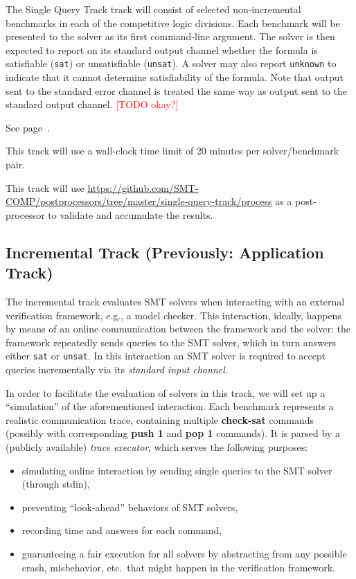\documentclass[12pt]{article}
\newcommand{\akey}[1]{\textbf{#1}\xspace}
\newcommand{\rem}[1]{\textcolor{red}{[#1]}}
\newcommand{\todo}[1]{\rem{TODO #1}}
\newcommand{\maintrack}{Single Query Track\xspace}
\begin{document}
The \maintrack track will consist of selected non-incremental benchmarks in
each of the competitive logic divisions.  Each benchmark will be presented to
the solver as its first command-line argument.  The solver is then expected to
report on its standard output channel whether the formula is satisfiable
(\texttt{sat}) or unsatisfiable (\texttt{unsat}).  A solver may also report
\texttt{unknown} to indicate that it cannot determine satisfiability of the
formula.  Note that output sent to the standard error channel is treated the
same way as output sent to the standard output channel. \todo{okay?}

 See page~\pageref{benchmark-selection}.

This track will use a wall-clock time limit of 20 minutes per solver/benchmark
pair.

This track will use
{\url{https://github.com/SMT-COMP/postprocessors/tree/master/single-query-track/process}}
as a post-processor
to validate and accumulate the results.

\subsection{Incremental Track (Previously: Application Track)}
\label{sec:exec:app}

The incremental track evaluates SMT solvers when interacting with an
external verification framework, e.g., a model checker. This
interaction, ideally, happens by means of an online communication
between the framework and the solver: the framework repeatedly sends
queries to the SMT solver, which in turn answers either \texttt{sat}
or \texttt{unsat}.  In this interaction an SMT solver is required to
accept queries incrementally via its \emph{standard input channel}.

In order to facilitate the evaluation of solvers in this track, we will set up
a ``simulation'' of the aforementioned interaction.  Each benchmark represents
a realistic communication trace, containing multiple \akey{check-sat} commands
(possibly with corresponding \akey{push 1} and \akey{pop 1} commands). It is
parsed by a (publicly available) \emph{trace executor},
which serves the following purposes:

\begin{itemize}
  \item simulating online interaction by sending single queries to the SMT
    solver (through stdin),
  \item preventing ``look-ahead'' behaviors of SMT solvers,
  \item recording time and answers for each command,
  \item guaranteeing a fair execution for all solvers by abstracting
  from any possible crash, misbehavior, etc.\ that might happen in the
  verification framework.
\end{itemize}
\end{document}
